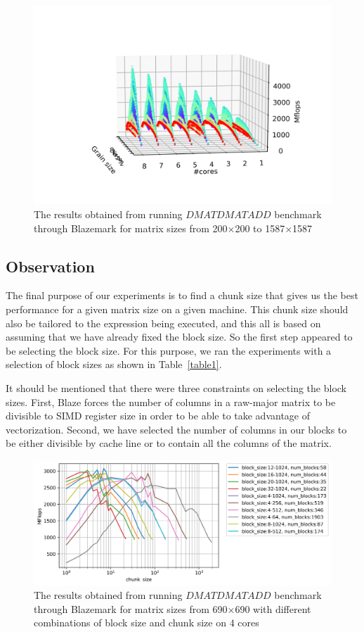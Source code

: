 \begin{figure}[H]
	\centering
	\includegraphics[width=1\linewidth]{images/fig4.png}
	\caption{The results obtained from running $DMATDMATADD$ benchmark through Blazemark for matrix sizes from 200$\times$200 to 1587$\times$1587}	
	\label{fig4}
\end{figure}

\vspace{\baselineskip}	
\subsection{Observation}
The final purpose of our experiments is to find a chunk size that gives us the best performance for a given matrix size on a given machine. This chunk size should also be tailored to the expression being executed, and this all is based on assuming that we have already fixed the block size.
So the first step appeared to be selecting the block size. For this purpose, we ran the experiments with a selection of block sizes as shown in Table~\ref{table1}.


It should be mentioned that there were three constraints on selecting the block sizes. First, Blaze forces the number of columns in a raw-major matrix to be divisible to SIMD register size in order to be able to take advantage of vectorization. Second, we have selected the number of columns in our blocks to be either divisible by cache line or to contain all the columns of the matrix.     


\begin{figure}[H]
	\centering
	\includegraphics[width=1\linewidth]{images/fig5.png}
	\caption{The results obtained from running $DMATDMATADD$ benchmark through Blazemark for matrix sizes from 690$\times$690 with different combinations of block size and chunk size on $4$ cores}	
	\label{fig5}
\end{figure}

